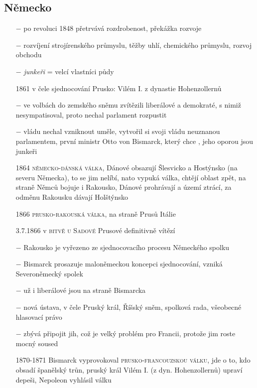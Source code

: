 \documentclass{article}
\begin{document}
\subsection*{Německo}
\begin{itemize}
    \vspace{-0.5em}
    \setlength\itemsep{0.15em}
    \item[$-$] po revoluci 1848 přetrvává rozdrobenost, překážka rozvoje
    \item[$-$] rozvíjení strojírenského průmyslu, těžby uhlí, chemického průmyslu, rozvoj obchodu
    \item[$-$] \textit{junkeři} = velcí vlastníci půdy
    \item[1861] v čele sjednocování Prusko: Vilém I. z dynastie Hohenzollernů
    \item[$-$] ve volbách do zemského sněmu zvítězili liberálové a demokraté, s nimiž nesympatisoval, proto nechal parlament rozpustit
    \item[$-$] vládu nechal vzniknout uměle, vytvořil si svoji vládu neuznanou parlamentem, první ministr Otto von Bismarck, který chce , jeho oporou jsou junkeři
    \item[1864] \textsc{německo-dánská válka}, Dánové obsazují  Šlesvicko a Hostýnsko (na severu Německa), to se jim nelíbí, nato vypuká válka, chtějí oblast zpět, na straně Němců bojuje i Rakousko, Dánové prohrávají a území ztrácí, za odměnu Rakousku dávají Holštýnsko
    \item[1866] \textsc{prusko-rakouská válka}, na straně Prusů Itálie
    \item[3.7.1866] v \textsc{bitvě u Sadové} Prusové definitivně vítězí
    \item[$-$] Rakousko je vyřezeno ze sjednocovacího procesu Německého spolku
    \item[$-$] Bismarck prosazuje maloněmeckou koncepci sjednocování, vzniká Severoněmecký spolek
    \item[$-$] už i liberálové jsou na straně Bismarcka
    \item[$-$] nová ústava, v čele Pruský král, Říšský sněm, spolková rada, všeobecné hlasovací právo
    \item[$-$] zbývá připojit jih, což je velký problém pro Francii, protože jim roste mocný soused
    \item[1870-1871] Bismarck vyprovokoval \textsc{prusko-francouzskou válku}, jde o to, kdo obsadí španělský trůn, pruský král Vilém I. (z dyn. Hohenzollernů) upraví depeši, Nepoleon vyhlásil válku

\end{itemize}
\end{document}
